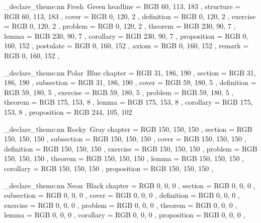 \elegant_declare_theme:nn { Fresh~Green }
  {
    headline     =   {RGB}{ 60,  113, 183 },
    structure    =   {RGB}{ 60,  113, 183 },
    cover        =   {RGB}{ 0,   120, 2   },
    definition   =   {RGB}{ 0,   120, 2   },
    exercise     =   {RGB}{ 0,   120, 2   },
    problem      =   {RGB}{ 0,   120, 2   },
    theorem      =   {RGB}{ 230, 90,  7   },
    lemma        =   {RGB}{ 230, 90,  7   },
    corollary    =   {RGB}{ 230, 90,  7   },
    proposition  =   {RGB}{ 0,   160, 152 },
    postulate    =   {RGB}{ 0,   160, 152 },
    axiom        =   {RGB}{ 0,   160, 152 },
    remark       =   {RGB}{ 0,   160, 152 },
  }

\elegant_declare_theme:nn { Polar~Blue }
  {
    chapter      =   {RGB}{ 31,  186, 190 },
    section      =   {RGB}{ 31,  186, 190 },
    subsection   =   {RGB}{ 31,  186, 190 },
    cover        =   {RGB}{ 59,  180, 5   },
    definition   =   {RGB}{ 59,  180, 5   },
    exercise     =   {RGB}{ 59,  180, 5   },
    problem      =   {RGB}{ 59,  180, 5   },
    theorem      =   {RGB}{ 175, 153, 8   },
    lemma        =   {RGB}{ 175, 153, 8   },
    corollary    =   {RGB}{ 175, 153, 8   },
    proposition  =   {RGB}{ 244, 105, 102 }
  }


\elegant_declare_theme:nn { Rocky~Gray }
  {
    chapter      =   {RGB}{ 150, 150, 150 },
    section      =   {RGB}{ 150, 150, 150 },
    subsection   =   {RGB}{ 150, 150, 150 },
    cover        =   {RGB}{ 150, 150, 150 },
    definition   =   {RGB}{ 150, 150, 150 },
    exercise     =   {RGB}{ 150, 150, 150 },
    problem      =   {RGB}{ 150, 150, 150 },
    theorem      =   {RGB}{ 150, 150, 150 },
    lemma        =   {RGB}{ 150, 150, 150 },
    corollary    =   {RGB}{ 150, 150, 150 },
    proposition  =   {RGB}{ 150, 150, 150 },
  }

\elegant_declare_theme:nn { Neon~Black }
  {
    chapter      =   {RGB}{ 0,   0,   0   },
    section      =   {RGB}{ 0,   0,   0   },
    subsection   =   {RGB}{ 0,   0,   0   },
    cover        =   {RGB}{ 0,   0,   0   },
    definition   =   {RGB}{ 0,   0,   0   },
    exercise     =   {RGB}{ 0,   0,   0   },
    problem      =   {RGB}{ 0,   0,   0   },
    theorem      =   {RGB}{ 0,   0,   0   },
    lemma        =   {RGB}{ 0,   0,   0   },
    corollary    =   {RGB}{ 0,   0,   0   },
    proposition  =   {RGB}{ 0,   0,   0   },
  }

\endinput